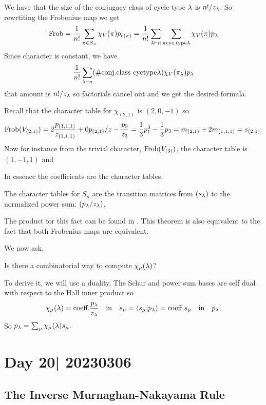 \documentclass[12pt]{memoir}
\begin{document}
\begin{ptcbp}
    We have that the size of the conjugacy class of cycle type $\lambda$ is $n!/z_\lambda$. So rewrtiting the Frobenius map we get 
    $$\operatorname{Frob}=\frac{1}{n!}\sum_{\pi\in S_n}\chi_V(\pi)p_{c(\pi)}=\frac{1}{n!}\sum_{\lambda\vdash n}\sum_{\pi\text{cyc.type}\lambda}\chi_V(\pi)p_{\lambda}$$
    Since character is constant, we have 
    $$\frac{1}{n!}\sum_{\lambda\vdash n}(\#\text{conj.class cyctype}\lambda)\chi_V(\pi_\lambda)p_\lambda$$
    that amount is $n!/z_\lambda$ so factorials cancel out and we get the desired formula.
\end{ptcbp}

\begin{Ex}
    Recall that the character table for $\chi_{(2,1)}$ is $(2,0,-1)$ so
    $$\operatorname{Frob}(V_{(2,1)})=2\frac{p_{(1,1,1)}}{z_{(1,1,1)}}+0p_{(2,1)}/z-\frac{p_3}{z_3}=\frac{1}{3}p_1^3-\frac{1}{3}p_3=m_{(2,1)}+2m_{(1,1,1)}=s_{(2,1)}.$$
    Now for instance from the trivial character, $\operatorname{Frob}(V_{(3)})$, the character table is $(1,-1,1)$ and 
\end{Ex}

In essence the coefficients are the character tables.

\begin{Th}
    The character tables for $S_n$ are the transition matrices from $(s_\lambda)$ to the normalized power sum: $(p_\lambda/z_\lambda)$. 
\end{Th}

The product for this fact can be found in \cite{StanleyEnum2}. This theorem is also equivalent to the fact that both Frobenius maps are equivalent.\par 
We now ask, 
\begin{significant}
    Is there a combinatorial way to compute $\chi_\mu(\lambda)$?
\end{significant}

To derive it, we will use a duality. The Schur and power sum bases are self dual with respect to the Hall inner product so 
$$\chi_\mu(\lambda)=\text{coeff.}\frac{p_\lambda}{z_\lambda}\quad\text{in}\quad s_\mu=\braket{s_\mu}{p_\lambda}=\text{coeff.}s_\mu\quad\text{in}\quad p_\lambda.$$
So $p_\lambda=\sum_\mu\chi_{\mu}(\lambda)s_{\mu}.$

\section{Day 20| 20230306}

\subsection*{The Inverse Murnaghan-Nakayama Rule}
\end{document}
